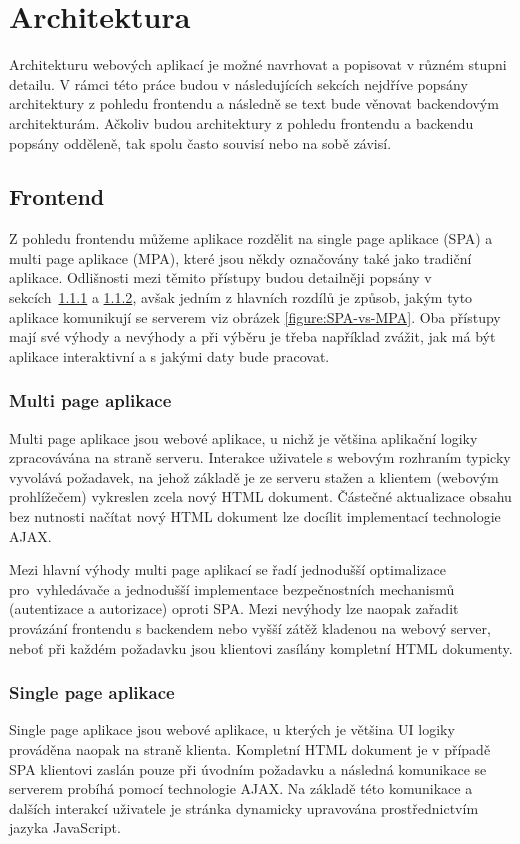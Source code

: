 \section{Architektura}\label{section:architecture}
Architekturu webových aplikací je možné navrhovat a popisovat v různém stupni detailu. V rámci této práce budou v následujících sekcích nejdříve popsány architektury z pohledu frontendu a následně se text bude věnovat backendovým architekturám. Ačkoliv budou architektury z pohledu frontendu a backendu popsány odděleně, tak spolu často souvisí nebo na sobě závisí.

\subsection{Frontend}
Z pohledu frontendu můžeme aplikace rozdělit na single page aplikace (SPA) a multi page aplikace (MPA), které jsou někdy označovány také jako tradiční aplikace. Odlišnosti mezi těmito přístupy budou detailněji popsány v sekcích~\ref{section:MPA} a \ref{section:SPA}, avšak jedním z hlavních rozdílů je způsob, jakým tyto aplikace komunikují se serverem viz obrázek \ref{figure:SPA-vs-MPA}. Oba přístupy mají své výhody a nevýhody a při výběru je třeba například zvážit, jak má být aplikace interaktivní a s jakými daty bude pracovat.

\subsubsection{Multi page aplikace}\label{section:MPA}
Multi page aplikace jsou webové aplikace, u nichž je většina aplikační logiky zpracovávána na straně serveru. Interakce uživatele s webovým rozhraním typicky vyvolává požadavek, na jehož základě je ze serveru stažen a klientem (webovým prohlížečem) vykreslen zcela nový HTML dokument. Částečné aktualizace obsahu bez nutnosti načítat nový HTML dokument lze docílit implementací technologie AJAX. \cite{mpa-spa-4}

Mezi hlavní výhody multi page aplikací se řadí jednodušší optimalizace pro~vyhledávače a jednodušší implementace bezpečnostních mechanismů (autentizace a autorizace) oproti SPA. Mezi nevýhody lze naopak zařadit provázání frontendu s backendem nebo vyšší zátěž kladenou na webový server, neboť při každém požadavku jsou klientovi zasílány kompletní HTML dokumenty. \cite{mpa-spa-5, mpa-spa-4, spa-security}

\subsubsection{Single page aplikace}\label{section:SPA}
Single page aplikace jsou webové aplikace, u kterých je většina UI logiky prováděna naopak na straně klienta. Kompletní HTML dokument je v případě SPA klientovi zaslán pouze při úvodním požadavku a následná komunikace se serverem probíhá pomocí technologie AJAX. Na základě této komunikace a dalších interakcí uživatele je stránka dynamicky upravována prostřednictvím jazyka JavaScript. \cite{mpa-spa-4, mpa-spa-3}


